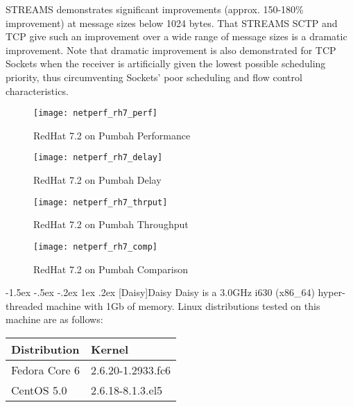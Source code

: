 \documentclass[letterpaper,final,notitlepage,twocolumn,10pt,twoside]{article}
\makeatletter
\let\normalsize = \small
\let\small = \footnotesize
\let\footnotesize = \scriptsize
\let\scriptsize = \tiny
\renewcommand\subsection{\@startsection{subsection}{2}{\z@}%
                                     {-1.5ex \@plus -.5ex \@minus -.2ex}%
                                     {1ex \@plus .2ex}%
                                     {\normalfont\normalsize\bfseries}}
\makeatother
\begin{document}
\begin{description}
STREAMS demonstrates significant improvements (approx. 150-180\% improvement) at message sizes below
1024 bytes.  That STREAMS SCTP and TCP give such an improvement over a wide range of message sizes
is a dramatic improvement.  Note that dramatic improvement is also demonstrated for TCP Sockets when
the receiver is artificially given the lowest possible scheduling priority, thus circumventing
Sockets' poor scheduling and flow control characteristics.

\end{description}

\begin{figure}[p]
\center\texttt{[image: netperf\_rh7\_perf]}
\caption[RedHat 7.2 on Pumbah Performance]{RedHat 7.2 on Pumbah Performance}
\label{figure:rh7perf}
\end{figure}

\begin{figure}[p]
\center\texttt{[image: netperf\_rh7\_delay]}
\caption[RedHat 7.2 on Pumbah Delay]{RedHat 7.2 on Pumbah Delay}
\label{figure:rh7dly}
\end{figure}

\begin{figure}[p]
\center\texttt{[image: netperf\_rh7\_thrput]}
\caption[RedHat 7.2 on Pumbah Throughput]{RedHat 7.2 on Pumbah Throughput}
\label{figure:rh7thrput}
\end{figure}

\begin{figure}[pt]
\center\texttt{[image: netperf\_rh7\_comp]}
\caption[RedHat 7.2 on Pumbah Comparison]{RedHat 7.2 on Pumbah Comparison}
\label{figure:rh7comp}
\end{figure}

\subsection[Daisy]{Daisy}
Daisy is a 3.0GHz i630 (x86\_64) hyper-threaded machine with 1Gb of memory.
Linux distributions tested on this machine are as follows:

\small
\setlength{\tabcolsep}{0.4em}
\setlength{\arraycolsep}{0.4em}
\begin{tabular}{ll}\\
Distribution & Kernel\\
\hline
Fedora Core 6 & 2.6.20-1.2933.fc6\\
CentOS 5.0 & 2.6.18-8.1.3.el5\\
\end{tabular}\\[1.0ex]
\normalsize
\end{document}

